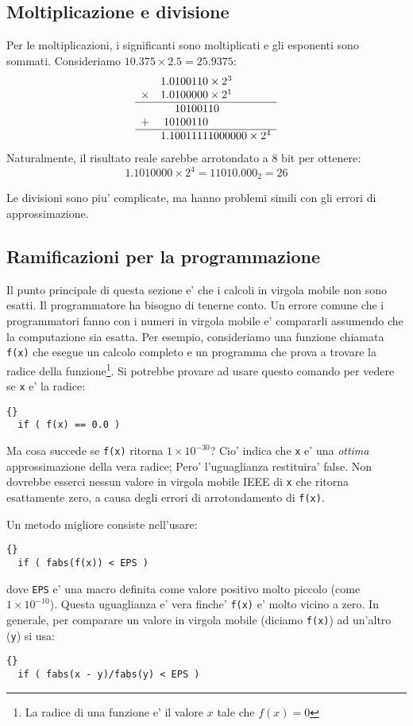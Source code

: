 \subsection{Moltiplicazione e divisione}

Per le moltiplicazioni, i significanti sono moltiplicati e gli esponenti
sono sommati. Consideriamo $10.375 \times 2.5 = 25.9375$:
\[
\begin{array}{rr@{}l}
 &  1.0&100110 \times 2^3 \\
\times &  1.0&100000 \times 2^1 \\ \hline
 &     &10100110 \\
+&   10&100110   \\ \hline
 &   1.1&0011111000000 \times 2^4
\end{array}
\]
Naturalmente, il risultato reale sarebbe arrotondato a 8 bit per ottenere:
\[1.1010000 \times 2^4 = 11010.000_2 = 26 \]

Le divisioni sono piu' complicate, ma hanno problemi simili con gli errori
di approssimazione.

\subsection{Ramificazioni per la programmazione}

Il punto principale di questa sezione e' che i calcoli in virgola mobile
non sono esatti. Il programmatore ha bisogno di tenerne conto. Un errore
comune che i programmatori fanno con i numeri in virgola mobile e' 
compararli assumendo che la computazione sia esatta. Per esempio, 
consideriamo una funzione chiamata \lstinline|f(x)| che esegue un
calcolo completo e un programma che prova a trovare la radice della
funzione\footnote{La radice di una funzione e' il valore $x$ tale che
$f(x) = 0$}. Si potrebbe provare ad usare questo comando per vedere
se \lstinline|x| e' la radice:
\begin{lstlisting}[stepnumber=0]{}
  if ( f(x) == 0.0 )
\end{lstlisting}
Ma cosa succede se \lstinline|f(x)| ritorna $1 \times 10^{-30}$? Cio' 
indica che \lstinline|x| e' una \emph{ottima} approssimazione della
vera radice; Pero' l'uguaglianza restituira' false. Non dovrebbe
esserci nessun valore in virgola mobile IEEE di \lstinline|x| che
ritorna esattamente zero, a causa degli errori di arrotondamento di
\lstinline|f(x)|.

Un metodo migliore consiste nell'usare:
\begin{lstlisting}[stepnumber=0]{}
  if ( fabs(f(x)) < EPS )
\end{lstlisting}
dove \lstinline|EPS| e' una macro definita come valore positivo molto
piccolo (come $1 \times 10^{-10}$).  Questa uguaglianza e' vera finche'
\lstinline|f(x)| e' molto vicino a zero. In generale, per comparare
un valore in virgola mobile (diciamo \lstinline|f(x)|) ad un'altro
(\lstinline|y|) si usa:
\begin{lstlisting}[stepnumber=0]{}
  if ( fabs(x - y)/fabs(y) < EPS )
\end{lstlisting}

